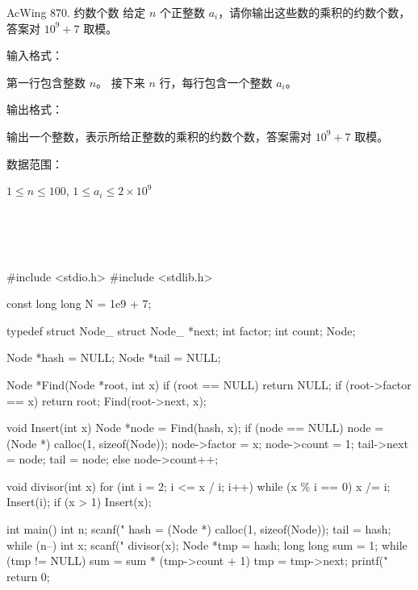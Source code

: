 \begin{titledbox}{AcWing 870. 约数个数}
    给定 $n$ 个正整数 $a_i$，请你输出这些数的乘积的约数个数，答案对 $10^9+7$ 取模。

    输入格式：

    第一行包含整数 $n$。 接下来 $n$ 行，每行包含一个整数 $a_i$。

    输出格式：

    输出一个整数，表示所给正整数的乘积的约数个数，答案需对 $10^9+7$ 取模。

    数据范围：

    $1 \le n \le 100$, $1 \le a_i \le 2 \times 10^9$

    \begin{inputblock}
         \\
         \\
         \\
    \end{inputblock}
    \begin{outputblock}
    \end{outputblock}
\end{titledbox}

\begin{mycpptwocol}[约数个数]
    #include <stdio.h>
    #include <stdlib.h>

    const long long N = 1e9 + 7;

    typedef struct Node_ {
        struct Node_ *next;
        int factor;
        int count;
    } Node;

    Node *hash = NULL;
    Node *tail = NULL;

    Node *Find(Node *root, int x) {
        if (root == NULL) {
            return NULL;
        }
        if (root->factor == x) {
            return root;
        }
        Find(root->next, x);
    }

    void Insert(int x) {
        Node *node = Find(hash, x);
        if (node == NULL) {
            node = (Node *) calloc(1, sizeof(Node));
            node->factor = x;
            node->count = 1;
            tail->next = node;
            tail = node;
        } else {
            node->count++;
        }
    }

    void divisor(int x) {
        for (int i = 2; i <= x / i; i++) {
            while (x \% i == 0) {
                x /= i;
                Insert(i);
            }
        }
        if (x > 1) {
            Insert(x);
        }
    }

    int main() {
        int n;
        scanf("%
        hash = (Node *) calloc(1, sizeof(Node));
        tail = hash;
        while (n--) {
            int x;
            scanf("%
            divisor(x);
        }
        Node *tmp = hash;
        long long sum = 1;
        while (tmp != NULL) {
            sum = sum * (tmp->count + 1) %
            tmp = tmp->next;
        }
        printf("%
        return 0;
    }
\end{mycpptwocol}

